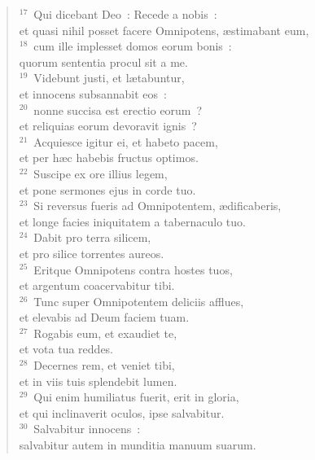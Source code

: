 \begin{flushleft}
\begin{verse}
${}^{17}$~Qui dicebant Deo~: Recede a nobis~:\\ et quasi nihil posset facere Omnipotens, \ae stimabant eum,\\
${}^{18}$~cum ille implesset domos eorum bonis~:\\ quorum sententia procul sit a me.\\
${}^{19}$~Videbunt justi, et l\ae tabuntur,\\ et innocens subsannabit eos~:\\
${}^{20}$~nonne succisa est erectio eorum~?\\ et reliquias eorum devoravit ignis~?\\
${}^{21}$~Acquiesce igitur ei, et habeto pacem,\\ et per h\ae c habebis fructus optimos.\\
${}^{22}$~Suscipe ex ore illius legem,\\ et pone sermones ejus in corde tuo.\\
${}^{23}$~Si reversus fueris ad Omnipotentem, \ae dificaberis,\\ et longe facies iniquitatem a tabernaculo tuo.\\
${}^{24}$~Dabit pro terra silicem,\\ et pro silice torrentes aureos.\\
${}^{25}$~Eritque Omnipotens contra hostes tuos,\\ et argentum coacervabitur tibi.\\
${}^{26}$~Tunc super Omnipotentem deliciis afflues,\\ et elevabis ad Deum faciem tuam.\\
${}^{27}$~Rogabis eum, et exaudiet te,\\ et vota tua reddes.\\
${}^{28}$~Decernes rem, et veniet tibi,\\ et in viis tuis splendebit lumen.\\
${}^{29}$~Qui enim humiliatus fuerit, erit in gloria,\\ et qui inclinaverit oculos, ipse salvabitur.\\
${}^{30}$~Salvabitur innocens~:\\ salvabitur autem in munditia manuum suarum.\end{verse}\end{flushleft}



